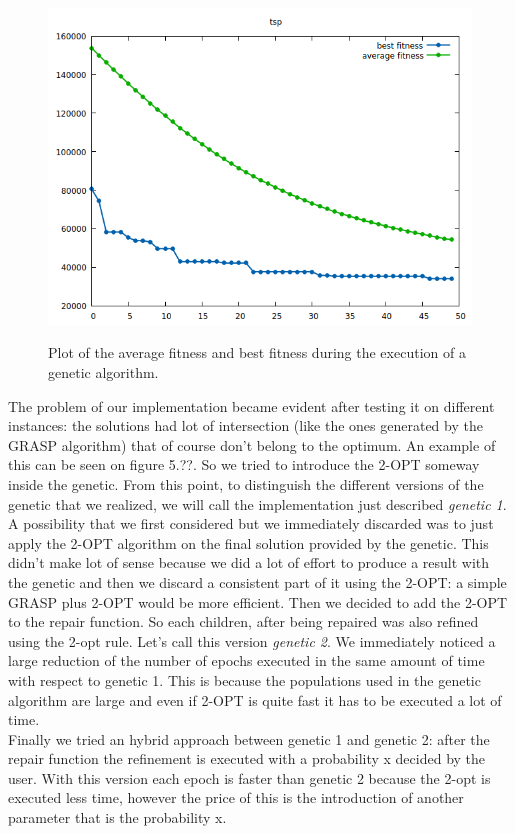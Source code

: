 \begin{figure}[h!]
\centering
	\includegraphics[scale=0.6]{media/fitnessPlot.png} \\
	\caption{Plot of the average fitness and best fitness during the execution of a genetic algorithm.}
\end{figure}

\noindent The problem of our implementation became evident after testing it on different instances: the solutions had lot of intersection (like the ones generated by the GRASP algorithm) that of course don't belong to the optimum. An example of this can be seen on figure 5.??. So we tried to introduce the 2-OPT someway inside the genetic. From this point, to distinguish the different versions of the genetic that we realized, we will call the implementation just described \textit{genetic 1}. \\
A possibility that we first considered but we immediately discarded was to just apply the 2-OPT algorithm on the final solution provided by the genetic. This didn't make lot of sense because we did a lot of effort to produce a result with the genetic and then we discard a consistent part of it using the 2-OPT: a simple GRASP plus 2-OPT would be more efficient.
Then we decided to add the 2-OPT to the repair function. So each children, after being repaired was also refined using the 2-opt rule. Let's call this version \textit{genetic 2}. We immediately noticed a large reduction of the number of epochs executed in the same amount of time with respect to genetic 1. This is because the populations used in the genetic algorithm are large and even if 2-OPT is quite fast it has to be executed a lot of time. \\
Finally we tried an hybrid approach between genetic 1 and genetic 2: after the repair function the refinement is executed with a probability x decided by the user. With this version each epoch is faster than genetic 2 because the 2-opt is executed less time, however the price of this is the introduction of another parameter that is the probability x.\\


